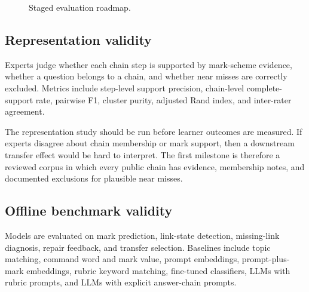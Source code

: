 \documentclass[11pt]{article}
\begin{document}
\begin{figure}[H]
\centering
{}
\caption{Staged evaluation roadmap.}
\label{fig:roadmap}
\end{figure}

\subsection{Representation validity}

Experts judge whether each chain step is supported by mark-scheme evidence, whether a question belongs to a chain, and whether near misses are correctly excluded. Metrics include step-level support precision, chain-level complete-support rate, pairwise F1, cluster purity, adjusted Rand index, and inter-rater agreement.

The representation study should be run before learner outcomes are measured. If experts disagree about chain membership or mark support, then a downstream transfer effect would be hard to interpret. The first milestone is therefore a reviewed corpus in which every public chain has evidence, membership notes, and documented exclusions for plausible near misses.

\subsection{Offline benchmark validity}

Models are evaluated on mark prediction, link-state detection, missing-link diagnosis, repair feedback, and transfer selection. Baselines include topic matching, command word and mark value, prompt embeddings, prompt-plus-mark embeddings, rubric keyword matching, fine-tuned classifiers, LLMs with rubric prompts, and LLMs with explicit answer-chain prompts.
\end{document}
